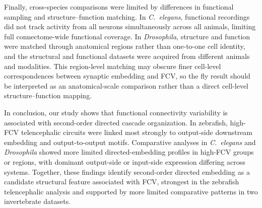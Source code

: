 \documentclass[9pt,twocolumn,twoside]{pnas-new}
\begin{document}
Finally, cross-species comparisons were limited by differences in functional sampling and structure--function matching. In \textit{C.~elegans}, functional recordings did not track activity from all neurons simultaneously across all animals, limiting full connectome-wide functional coverage. In \textit{Drosophila}, structure and function were matched through anatomical regions rather than one-to-one cell identity, and the structural and functional datasets were acquired from different animals and modalities. This region-level matching may obscure finer cell-level correspondences between synaptic embedding and FCV, so the fly result should be interpreted as an anatomical-scale comparison rather than a direct cell-level structure--function mapping.

In conclusion, our study shows that functional connectivity variability is associated with second-order directed cascade organization. In zebrafish, high-FCV telencephalic circuits were linked most strongly to output-side downstream embedding and output-to-output motifs. Comparative analyses in \textit{C.~elegans} and \textit{Drosophila} showed more limited directed-embedding profiles in high-FCV groups or regions, with dominant output-side or input-side expression differing across systems. Together, these findings identify second-order directed embedding as a candidate structural feature associated with FCV, strongest in the zebrafish telencephalic analysis and supported by more limited comparative patterns in two invertebrate datasets.
\end{document}
